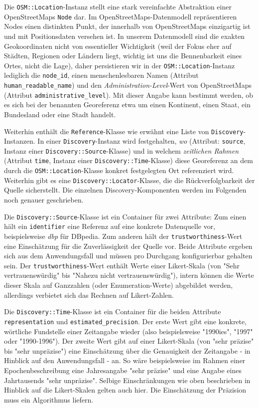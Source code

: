 Die \texttt{OSM::Location}-Instanz stellt eine stark vereinfachte Abstraktion einer OpenStreetMaps \texttt{Node}\cite{OSMnode} dar. Im OpenStreetMaps-Datenmodell repräsentieren Nodes einen distinkten Punkt, der innerhalb von OpenStreetMaps einzigartig ist und mit Positionsdaten versehen ist. In unserem Datenmodell sind die exakten Geokoordinaten nicht von essentieller Wichtigkeit (weil der Fokus eher auf Städten, Regionen oder Ländern liegt, wichtig ist uns die Bennenbarkeit eines Ortes, nicht die Lage), daher persistieren wir in der \texttt{OSM::Location}-Instanz lediglich die \texttt{node\_id}, einen menschenlesbaren Namen (Attribut \texttt{human\_readable\_name}) und den \textit{Administration-Level}-Wert von OpenStreetMaps\cite{OSMadminlevel} (Attribut \texttt{administrative\_level}). Mit dieser Angabe kann bestimmt werden, ob es sich bei der benannten Georeferenz etwa um einen Kontinent, einen Staat, ein Bundesland oder eine Stadt handelt.

Weiterhin enthält die \texttt{Reference}-Klasse wie erwähnt eine Liste von \texttt{Discovery}-Instanzen. In einer \texttt{Discovery}-Instanz wird festgehalten, \textit{wo} (Attribut: \texttt{source}, Instanz einer \texttt{Discovery::Source}-Klasse) und in welchem \textit{zeitlichen Rahmen} (Attribut \texttt{time}, Instanz einer \texttt{Discovery::Time}-Klasse) diese Georeferenz an dem durch die \texttt{OSM::Location}-Klasse konkret festgelegten Ort referenziert wird. Weiterhin gibt es eine \texttt{Discovery::Locator}-Klasse, die die Rückverfolgbarkeit der Quelle sicherstellt. Die einzelnen Discovery-Komponenten werden im Folgenden noch genauer geschrieben.

Die \texttt{Discovery::Source}-Klasse ist ein Container für zwei Attribute: Zum einen hält ein \texttt{identifier} eine Referenz auf eine konkrete Datenquelle vor, beispielsweise \textit{dbp} für DBpedia. Zum anderen hält der \texttt{trustworthiness}-Wert eine Einschätzung für die Zuverlässigkeit der Quelle vor. Beide Attribute ergeben sich aus dem Anwendungsfall und müssen pro Durchgang konfigurierbar gehalten sein. Der \texttt{trustworthiness}-Wert enthält Werte einer Likert-Skala (von "Sehr vertrauenswürdig" bis "Nahezu nicht vertrauenswürdig"), intern können die Werte dieser Skala auf Ganzzahlen (oder Enumeration-Werte) abgebildet werden, allerdings verbietet sich das Rechnen auf Likert-Zahlen.

Die \texttt{Discovery::Time}-Klasse ist ein Container für die beiden Attribute \texttt{representation} und \texttt{estimated\_precision}. Der erste Wert gibt eine konkrete, wörtliche Fundstelle einer Zeitangabe wieder (also beispielsweise "1990ies", "1997" oder "1990-1996"). Der zweite Wert gibt auf einer Likert-Skala (von "sehr präzise" bis "sehr unpräzise") eine Einschätzung über die Genauigkeit der Zeitangabe - in Hinblick auf den Anwendungsfall - an. So wäre beispielsweise im Rahmen einer Epochenbeschreibung eine Jahresangabe "sehr präzise" und eine Angabe eines Jahrtausends "sehr unpräzise". Selbige Einschränkungen wie oben beschrieben in Hinblick auf die Likert-Skalen gelten auch hier. Die Einschätzung der Präzision muss ein Algorithmus liefern.

